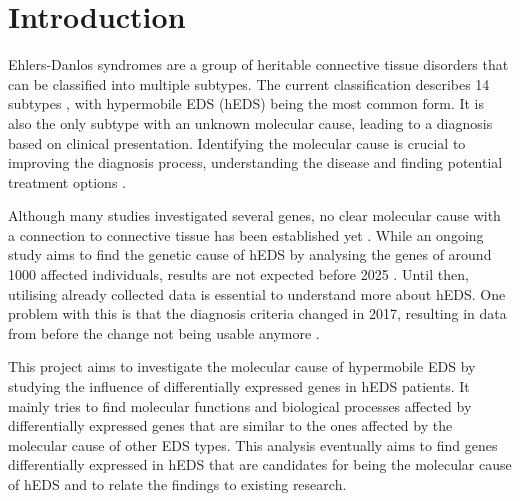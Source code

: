 \section{Introduction}


Ehlers-Danlos syndromes are a group of heritable connective tissue disorders that can be classified into multiple subtypes. The current classification describes 14 subtypes \cite{classification2017, Malfait2020}, with hypermobile EDS (hEDS) being the most common form. It is also the only subtype with an unknown molecular cause, leading to a diagnosis based on clinical presentation. Identifying the molecular cause is crucial to improving the diagnosis process, understanding the disease and finding potential treatment options \cite{Ritelli2020}.

Although many studies investigated several genes, no clear molecular cause with a connection to connective tissue has been established yet \cite{Caliogna2021}. While an ongoing study aims to find the genetic cause of hEDS by analysing the genes of around 1000 affected individuals, results are not expected before 2025 \cite{HEDGE}. Until then, utilising already collected data is essential to understand more about hEDS. One problem with this is that the diagnosis criteria changed in 2017, resulting in data from before the change not being usable anymore \cite{Gensemer2021, Ritelli2022}.
%
%

This project aims to investigate the molecular cause of hypermobile EDS by studying the influence of differentially expressed genes in hEDS patients. It mainly tries to find molecular functions and biological processes affected by differentially expressed genes that are similar to the ones affected by the molecular cause of other EDS types. This analysis eventually aims to find genes differentially expressed in hEDS that are candidates for being the molecular cause of hEDS and to relate the findings to existing research.
